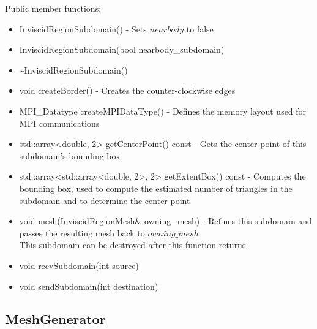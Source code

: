 \documentclass[manuscript, screen]{acmart}
\begin{document}
Public member functions:
\begin{itemize}
\item InviscidRegionSubdomain() - Sets $nearbody$ to false

\item InviscidRegionSubdomain(bool nearbody\_subdomain)

\item \textasciitilde{}InviscidRegionSubdomain()
%

\item void createBorder() - Creates the counter-clockwise edges

\item MPI\_Datatype createMPIDataType() - Defines the memory layout used for MPI communications

\item std::array<double, 2> getCenterPoint() const - Gets the center point of this subdomain's bounding box

\item std::array<std::array<double, 2>, 2> getExtentBox() const - Computes the bounding box, used to compute the estimated number of triangles in the subdomain and to determine the center point

\item void mesh(InviscidRegionMesh\& owning\_mesh) - Refines this subdomain and passes the resulting mesh back to $owning\_mesh$\\
This subdomain can be destroyed after this function returns

\item void recvSubdomain(int source)

\item void sendSubdomain(int destination)

\end{itemize}

\subsection{MeshGenerator}
\end{document}
